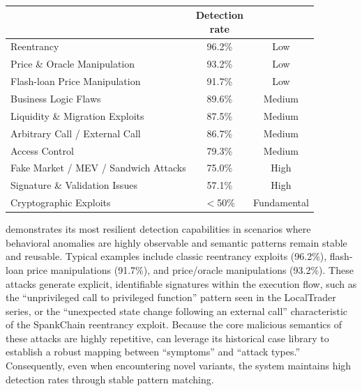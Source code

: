 \begin{table}[t]
	\centering
	\caption{}
	\label{tab:capability_spectrum}
	\small
\setlength{\tabcolsep}{3pt}
	\begin{tabular}{@{}>{\raggedright\arraybackslash}p{}cc@{}}
		\toprule
		\text{Type} & \makecell{Detection\\rate} & \text{Difficulty} \\
		\midrule
		Reentrancy & 96.2\% & Low \\
        Price \& Oracle Manipulation & 93.2\% & Low \\
		Flash-loan Price Manipulation & 91.7\% & Low \\
		Business Logic Flaws & 89.6\% & Medium \\
		Liquidity \& Migration Exploits & 87.5\% & Medium \\
		Arbitrary Call / External Call & 86.7\% & Medium \\
		Access Control & 79.3\% & Medium \\
		Fake Market / MEV / Sandwich Attacks & 75.0\% & High \\
		Signature \& Validation Issues & 57.1\% & High \\
		Cryptographic Exploits  & $<$50\% & Fundamental \\
		\bottomrule
	\end{tabular}
	
	\smallskip\scriptsize{}
\end{table}


\approach{} demonstrates its most resilient detection capabilities in scenarios where behavioral anomalies are highly observable and semantic patterns remain stable and reusable. Typical examples include classic reentrancy exploits (96.2\%), flash-loan price manipulations (91.7\%), and price/oracle manipulations (93.2\%). These attacks generate explicit, identifiable signatures within the execution flow, such as the ``unprivileged call to privileged function'' pattern seen in the LocalTrader series, or the ``unexpected state change following an external call'' characteristic of the SpankChain reentrancy exploit. Because the core malicious semantics of these attacks are highly repetitive, \approach{} can leverage its historical case library to establish a robust mapping between ``symptoms'' and ``attack types.'' Consequently, even when encountering novel variants, the system maintains high detection rates through stable pattern matching.

